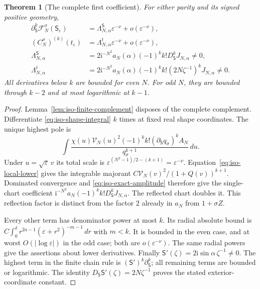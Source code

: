 \documentclass[11pt]{article}
\numberwithin{equation}{section}
\newtheorem{theorem}{Theorem}[section]
\theoremstyle{definition}
\newcommand{\ii}{\mathrm i}
\newcommand{\eps}{\varepsilon}
\begin{document}
\begin{theorem}[The complete first coefficient]
\label{thm:iso-first-coefficient}
For either parity and its signed positive geometry,
\begin{align}
 \partial_{\mathsf S}^{k}\mathcal F_N^\sigma(\mathsf S_\eps)
     &=\Lambda^{\mathsf S}_{N,\alpha}\eps^{-\nu}
                                      +o(\eps^{-\nu}),
                                        \label{eq:iso-first-S}\\
 (C_N^\sigma)^{(k)}(t_\eps)
     &=\Lambda^{t}_{N,\alpha}\eps^{-\nu}
                                      +o(\eps^{-\nu}),
                                        \label{eq:iso-first-t}\\
 \Lambda^{\mathsf S}_{N,\alpha}
     &=2\ii^{-N^2}a_N(\alpha)(-1)^k k!
                      D_{\mathsf S}^{k}J_{N,\alpha}\ne0,
     \nonumber\\
 \Lambda^{t}_{N,\alpha}
     &=2\ii^{-N^2}a_N(\alpha)(-1)^k k!
                      (2N\zeta^{-1})^kJ_{N,\alpha}\ne0.
                                        \label{eq:iso-first-constants}
\end{align}
All derivatives below $k$ are bounded for even $N$.
For odd $N$, they are bounded through $k-2$ and at most logarithmic
at $k-1$.
\end{theorem}
\begin{proof}
Lemma~\ref{lem:iso-finite-complement} disposes of the complete
complement.  Differentiate \eqref{eq:iso-shape-integral} $k$ times
at fixed real shape coordinates.  The unique highest pole is
\[
 \int\frac{\chi(u)\mathcal V_N(u)^2
           (-1)^k k!(\partial_{\mathsf S}q_\sigma)^k A_N}
               {q_\sigma^{k+1}}\,du.
\]
Under $u=\sqrt\eps\,v$ its total scale is
$\eps^{(N^2-1)/2-(k+1)}=\eps^{-\nu}$.
Equation~\eqref{eq:iso-local-lower} gives the integrable majorant
$C\mathcal V_N(v)^2/(1+Q(v))^{k+1}$.
Dominated convergence and \eqref{eq:iso-exact-amplitude} therefore
give the single-chart coefficient
$\ii^{-N^2}a_N(-1)^k k!D_{\mathsf S}^{k}J_{N,\alpha}$.
The reflected chart doubles it.  This reflection factor is distinct
from the factor $2$ already in $a_N$ from $1+\sigma Z$.

Every other term has denominator power at most $k$.
Its radial absolute bound is
$C\int_0^\delta r^{2a-1}(\eps+r^2)^{-m-1}\,dr$ with $m<k$.
It is bounded in the even case, and at worst $O(|\log\eps|)$ in
the odd case; both are $o(\eps^{-\nu})$.  The same radial powers
give the assertions about lower derivatives.
Finally $\mathsf S'(\zeta)=2\ii\sin\alpha\,\zeta^{-1}\ne0$.
The highest term in the finite chain rule is
$(\mathsf S')^k\partial_{\mathsf S}^{k}$; all remaining terms
are bounded or logarithmic.  The identity
$D_{\mathsf S}\mathsf S'(\zeta)=2N\zeta^{-1}$ proves the stated
exterior-coordinate constant.
\end{proof}
\end{document}
